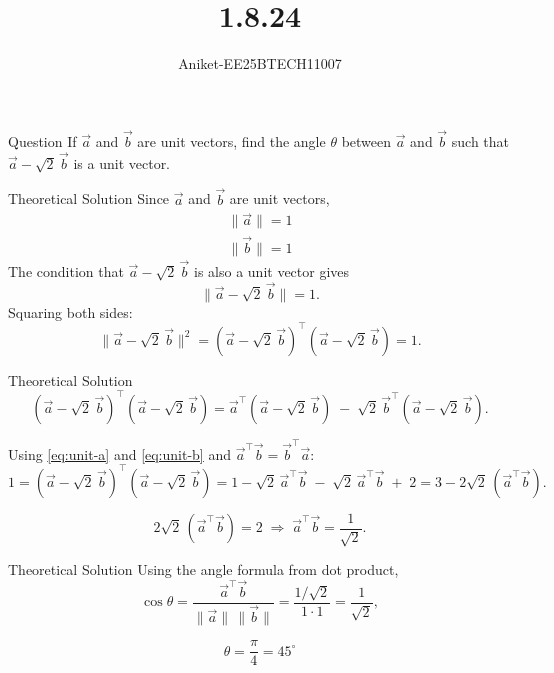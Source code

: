 \documentclass{beamer}
\title %
{1.8.24}
\author %
{Aniket-EE25BTECH11007}
\begin{document}
\frame{\titlepage}
\begin{frame}{Question}
If $\vec a$ and $\vec b$ are unit vectors, find the angle $\theta$ between $\vec a$ and $\vec b$
such that $\vec a-\sqrt{2}\,\vec b$ is a unit vector.\\
\end{frame}

\begin{frame}{Theoretical Solution}
    Since $\vec a$ and $\vec b$ are unit vectors,
\begin{gather}
\lVert \vec a \rVert = 1 \label{eq:unit-a}\\
\lVert \vec b \rVert = 1 \label{eq:unit-b}
\end{gather}
The condition that $\vec a-\sqrt{2}\,\vec b$ is also a unit vector gives
\begin{equation}
\big\lVert \vec a-\sqrt{2}\,\vec b \big\rVert = 1.
\label{eq:unit-cond}
\end{equation}
Squaring both sides:
\begin{equation}
\big\lVert \vec a-\sqrt{2}\,\vec b\big\rVert^{2}
= (\vec a-\sqrt{2}\,\vec b)^{\top}(\vec a-\sqrt{2}\,\vec b)=1.
\label{eq:norm-squared}
\end{equation}

\end{frame}

\begin{frame}{Theoretical Solution}
    \begin{equation}
(\vec a-\sqrt{2}\,\vec b)^{\top}(\vec a-\sqrt{2}\,\vec b)
= \vec a^{\top}(\vec a-\sqrt{2}\,\vec b)
\;-\;\sqrt{2}\,\vec b^{\top}(\vec a-\sqrt{2}\,\vec b).
\label{eq:distribute-outer}
\end{equation}

Using \eqref{eq:unit-a} and \eqref{eq:unit-b} and $\vec a^{\top}\vec b=\vec b^{\top}\vec a$:
\begin{equation}
1=(\vec a-\sqrt{2}\,\vec b)^{\top}(\vec a-\sqrt{2}\,\vec b)
= 1 -\sqrt{2}\,\vec a^{\top}\vec b \;-\;\sqrt{2}\,\vec a^{\top}\vec b \;+\;2
= 3 - 2\sqrt{2}\,(\vec a^{\top}\vec b).
\label{eq:combine}
\end{equation}

\begin{equation}
2\sqrt{2}\,(\vec a^{\top}\vec b)=2
\;\Longrightarrow\;
\vec a^{\top}\vec b=\frac{1}{\sqrt{2}}.
\label{eq:atb}
\end{equation}
\end{frame}

\begin{frame}{Theoretical Solution}
    Using the angle formula from dot product,
\begin{equation}
\cos\theta=\frac{\vec a^{\top}\vec b}{\lVert\vec a\rVert\,\lVert\vec b\rVert}
=\frac{1/\sqrt{2}}{1\cdot 1}=\frac{1}{\sqrt{2}},
\label{eq:costheta}
\end{equation}

\begin{equation}
\boxed{\;\theta=\frac{\pi}{4}=45^\circ\;}
\label{eq:final}
\end{equation}
\end{frame}
\end{document}
